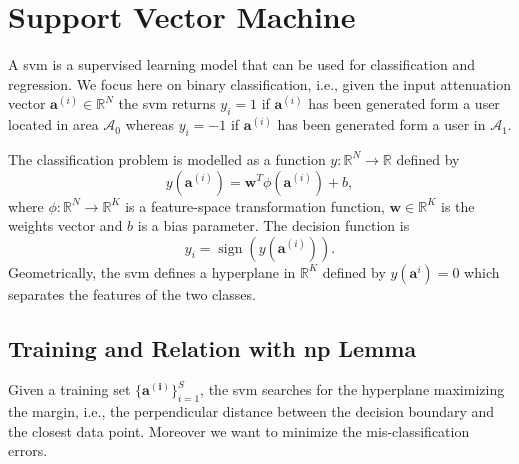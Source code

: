 \documentclass[draftcls,onecolumn,12pt]{IEEEtran}
\newcommand{\ie}{i.e., }
\DeclareMathOperator{\sign}{sign}
\begin{document}
\section{Support Vector Machine}\label{sec:svm}
A \ac{svm} \cite{Bishop2006} is a supervised learning model that can be used for classification and regression. We focus here on binary classification, \ie given the input attenuation vector $\mathbf{a}^{(i)} \in \mathbb{R}^N$ the \ac{svm} returns $y_i = 1$ if $\mathbf{a}^{(i)}$ has been generated form a user located in area $\mathcal{A}_0$ whereas $y_i=-1$ if $\mathbf{a}^{(i)}$ has been generated form a user in $\mathcal{A}_1$.

The classification problem is modelled as a function $y: \mathbb{R}^N \to \mathbb{R}$ defined by
\begin{equation}
\label{eq:svm}
	y(\mathbf{a}^{(i)}) = \mathbf{w}^T \phi (\mathbf{a}^{(i)}) + b,
\end{equation}
where $\phi: \mathbb{R}^N \to \mathbb{R}^K$ is a feature-space transformation function, $\mathbf{w} \in \mathbb{R}^K$ is the weights vector and $b$ is a bias parameter. The decision function is 
\begin{equation}
\label{eq:sign}
	y_i = \sign(y(\mathbf{a}^{(i)})).
\end{equation}
Geometrically, the \ac{svm} defines a hyperplane in $\mathbb{R}^K$ defined by $y(\mathbf{a}^i)=0$ which separates the features of the two classes.

\subsection{Training and Relation with \ac{np} Lemma}
Given a training set $\{\mathbf{a^{(i)}}\}_{i=1}^S$, the \ac{svm} searches for the hyperplane maximizing the margin, \ie the perpendicular distance between the decision boundary and the closest data point. 
Moreover we want to minimize the mis-classification errors.
\end{document}
